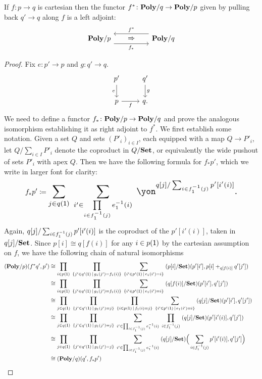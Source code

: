 \documentclass[Book-Poly]{subfiles}
\begin{document}
\begin{theorem}\label{thm.cart_exponentiable}
If $f\colon p\to q$ is cartesian then the functor $f^*\colon\textbf{Poly}/q\to\textbf{Poly}/p$ given by pulling back $q'\to q$ along $f$ is a left adjoint:
\[
\begin{tikzcd}[column sep=50pt, background color=theoremcolor]
	\poly/p\ar[r, shift right=7pt, "f_*"']&
	\poly/q\ar[l, shift right=7pt, "f^*"']\ar[l, phantom, "\Rightarrow"]
\end{tikzcd}
\]
\end{theorem}
\begin{proof}
Fix $e\colon p'\to p$ and $g\colon q'\to q$.
\[
\begin{tikzcd}
	p'\ar[d, "e"']&q'\ar[d, "g"]\\
	p\ar[r, "f"']&q.
\end{tikzcd}
\]
We need to define a functor $f_*\colon\textbf{Poly}/p\to\textbf{Poly}/q$ and prove the analogous isomorphism establishing it as right adjoint to $f^*$. We first establish some notation. Given a set $Q$ and sets $(P'_i)_{i\in I}$, each equipped with a map $Q\to P'_i$, let $Q/\sum_{i\in I}P'_i$ denote the coproduct in $Q/\textbf{Set}$, or equivalently the wide pushout of sets $P'_i$ with apex $Q$. Then we have the following formula for $f_*p'$, which we write in larger font for clarity:
\begin{equation}\label{eqn.cart_exp}
f_*p'\coloneqq
\scalebox{1.3}{$\displaystyle
\sum_{j\in q(\1)}\;\sum_{i'\in\prod\limits_{i\in f_1\inv(j)}e_1\inv(i)}\;\yon^{q[j]/\sum_{i\in f_1\inv(j)}p'[i'(i)]}.
$}
\end{equation}
Again, $q[j]/\sum_{i\in f_1^{-1}(j)}p'[i'(i)]$ is the coproduct of the $p'[i'(i)]$, taken in $q[j]/\textbf{Set}$. Since $p[i]\cong q[f(i)]$ for any $i\in p(\textsf{1})$ by the cartesian assumption on $f$, we have the following chain of natural isomorphisms
\begin{align*}
	(\textbf{Poly}/p)(f^*q', p')&\cong
	\prod_{i\in p(\textsf{1})}\;\prod_{\{j'\in q'(\textsf{1})\,\mid\,g_1(j')=f_1(i)\}}\;\sum_{\{i'\in p'(\textsf{1})\,\mid\,e_1(i')=i\}}\;(p[i]/\textbf{Set})(p'[i'],p[i]+_{q[f(i)]}q'[j'])\\&\cong
	\prod_{i\in p(\textsf{1})}\;\prod_{\{j'\in q'(\textsf{1})\,\mid\,g_1(j')=f_1(i)\}}\;\sum_{\{i'\in p'(\textsf{1})\,\mid\,e_1(i')=i\}}\;(q[f(i)]/\textbf{Set})(p'[i'],q'[j'])\\&\cong
	\prod_{j\in q(\textsf{1})}\;\prod_{\{j'\in q'(\textsf{1})\,\mid\, g_1(j')=j\}}\;\prod_{\{i\in p(\textsf{1})\,\mid\,f_1(i)=j\}}\;\sum_{\{i'\in p'(\textsf{1})\,\mid\,e_1(i')=i\}}\;(q[j]/\textbf{Set})(p'[i'],q'[j'])\\&\cong
	\prod_{j\in q(\textsf{1})}\;\prod_{\{j'\in q'(\textsf{1})\,\mid\, g_1(j')=j\}}\;\sum_{i'\in\prod_{i\in f_1^{-1}(j)}e_1^{-1}(i)}\;\prod_{i\in f_1^{-1}(j)}\;(q[j]/\textbf{Set})(p'[i'(i)],q'[j'])\\&\cong
	\prod_{j\in q(\textsf{1})}\;\prod_{\{j'\in q'(\textsf{1})\,\mid\, g_1(j')=j\}}\;\sum_{i'\in\prod_{i\in f_1^{-1}(j)}e_1^{-1}(i)}\;(q[j]/\textbf{Set})\Big(\sum_{i\in f_1^{-1}(j)}p'[i'(i)],q'[j']\Big)\\&\cong
	(\textbf{Poly}/q)(q',f_*p')
	&\qedhere
\end{align*}
\end{proof}
\end{document}
